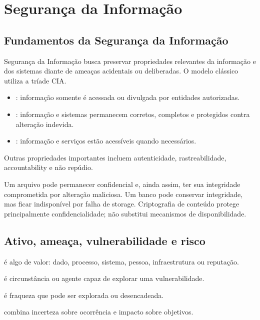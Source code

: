 \chapter{Segurança da Informação}

\section{Fundamentos da Segurança da Informação}

Segurança da Informação busca preservar propriedades relevantes da informação e dos sistemas diante de ameaças acidentais ou deliberadas. O modelo clássico utiliza a tríade CIA.

\begin{itemize}
\item {}: informação somente é acessada ou divulgada por entidades autorizadas.
\item {}: informação e sistemas permanecem corretos, completos e protegidos contra alteração indevida.
\item {}: informação e serviços estão acessíveis quando necessários.
\end{itemize}

Outras propriedades importantes incluem autenticidade, rastreabilidade, accountability e não repúdio.

\begin{exemplo}
Um arquivo pode permanecer confidencial e, ainda assim, ter sua integridade comprometida por alteração maliciosa. Um banco pode conservar integridade, mas ficar indisponível por falha de storage. Criptografia de conteúdo protege principalmente confidencialidade; não substitui mecanismos de disponibilidade.
\end{exemplo}

\section{Ativo, ameaça, vulnerabilidade e risco}

 é algo de valor: dado, processo, sistema, pessoa, infraestrutura ou reputação.

 é circunstância ou agente capaz de explorar uma vulnerabilidade.

 é fraqueza que pode ser explorada ou desencadeada.

 combina incerteza sobre ocorrência e impacto sobre objetivos.

